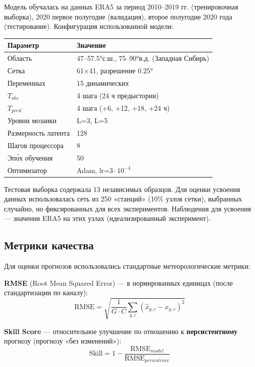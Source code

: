 \documentclass[14pt,a4paper]{extarticle}
\newcounter{none}
\numberwithin{table}{section}
\numberwithin{figure}{section}
\numberwithin{equation}{section}
\begin{document}
Модель обучалась на данных ERA5 за период 2010--2019 гг. (тренировочная
выборка), 2020 первое полугодие (валидация), второе полугодие 2020 года
(тестирование). Конфигурация использованной модели:

{\def\LTcaptype{none} %
\begin{longtable}[]{@{}ll@{}}
\toprule\noalign{}
Параметр & Значение \\
\midrule\noalign{}
\endhead
\bottomrule\noalign{}
\endlastfoot
Область & 47--57.5°с.ш., 75--90°в.д. (Западная Сибирь) \\
Сетка & 61×41, разрешение 0.25° \\
Переменных & 15 динамических \\
\(T_{obs}\) & 4 шага (24 ч предыстории) \\
\(T_{pred}\) & 4 шага (+6, +12, +18, +24 ч) \\
Уровни мозаики & L=3, L=5 \\
Размерность латента & 128 \\
Шагов процессора & 8 \\
Эпо̀х обучения & 50 \\
Оптимизатор & Adam, lr=\(3\cdot10^{-4}\) \\
\end{longtable}
}

Тестовая выборка содержала 13 независимых образцов. Для оценки усвоения
данных использовалась сеть из 250 «станций» (10\% узлов сетки),
выбранных случайно, но фиксированных для всех экспериментов. Наблюдения
для усвоения --- значения ERA5 на этих узлах (идеализированный
эксперимент).

\subsection{Метрики качества}\label{ux43cux435ux442ux440ux438ux43aux438-ux43aux430ux447ux435ux441ux442ux432ux430}

Для оценки прогнозов использовались стандартные метеорологические
метрики:

\textbf{RMSE} (Root Mean Squared Error) --- в нормированных единицах
(после стандартизации по каналу):
\[\text{RMSE} = \sqrt{\frac{1}{G \cdot C} \sum_{g,c} \left(\hat{x}_{g,c} - x_{g,c}\right)^2}\]

\textbf{Skill Score} --- относительное улучшение по отношению к
\textbf{персистентному} прогнозу (прогнозу «без изменений»):
\[\text{Skill} = 1 - \frac{\text{RMSE}_{model}}{\text{RMSE}_{persistence}}\]
\end{document}
